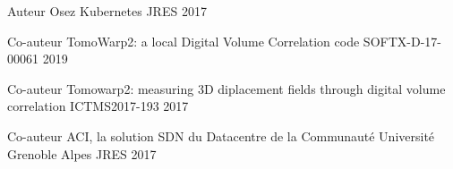 

\begin{cventries}

  \cventrynodescr
    {Auteur} %
    {Osez Kubernetes} %
    {JRES} %
    {2017} %

  \cventrynodescr
    {Co-auteur} %
    {TomoWarp2: a local Digital Volume Correlation code} %
    {SOFTX-D-17-00061} %
    {2019} %

  \cventrynodescr
    {Co-auteur} %
    {Tomowarp2: measuring 3D diplacement fields through digital volume correlation} %
    {ICTMS2017-193} %
    {2017} %

  \cventrynodescr
    {Co-auteur} %
    {ACI, la solution SDN du Datacentre de la Communauté Université Grenoble Alpes} %
    {JRES} %
    {2017} %

\end{cventries}

